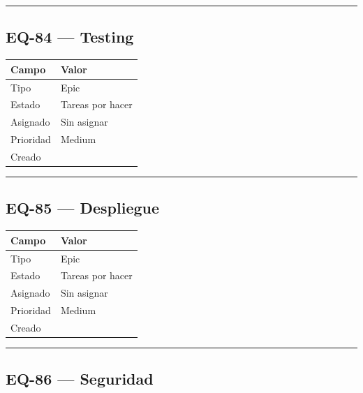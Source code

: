 \documentclass[
  spanish,
  11pt,
]{report}
\newcounter{none} %
\begin{document}
\begin{center}\rule{0.5\linewidth}{0.5pt}\end{center}

\subsection{EQ-84 --- Testing}\label{eq-84-testing}

{\def\LTcaptype{none} %
\begin{longtable}[]{@{}ll@{}}
\toprule\noalign{}
Campo & Valor \\
\midrule\noalign{}
\endhead
\bottomrule\noalign{}
\endlastfoot
Tipo & Epic \\
Estado & Tareas por hacer \\
Asignado & Sin asignar \\
Prioridad & Medium \\
Creado & \\
\end{longtable}
}

\begin{center}\rule{0.5\linewidth}{0.5pt}\end{center}

\subsection{EQ-85 --- Despliegue}\label{eq-85-despliegue}

{\def\LTcaptype{none} %
\begin{longtable}[]{@{}ll@{}}
\toprule\noalign{}
Campo & Valor \\
\midrule\noalign{}
\endhead
\bottomrule\noalign{}
\endlastfoot
Tipo & Epic \\
Estado & Tareas por hacer \\
Asignado & Sin asignar \\
Prioridad & Medium \\
Creado & \\
\end{longtable}
}

\begin{center}\rule{0.5\linewidth}{0.5pt}\end{center}

\subsection{EQ-86 --- Seguridad}\label{eq-86-seguridad}
\end{document}
